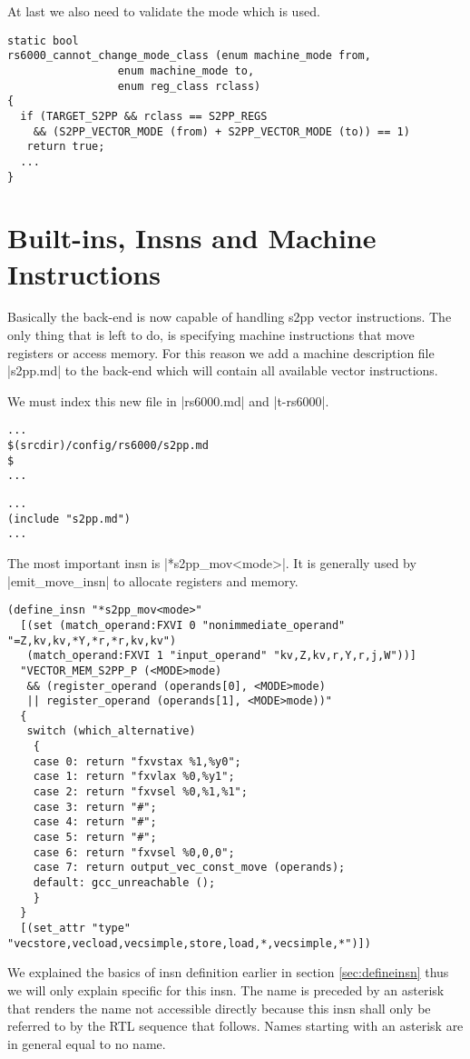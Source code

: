 At last we also need to validate the mode which is used.
\begin{lstlisting}
static bool
rs6000_cannot_change_mode_class (enum machine_mode from,
                 enum machine_mode to,
                 enum reg_class rclass)
{
  if (TARGET_S2PP && rclass == S2PP_REGS
    && (S2PP_VECTOR_MODE (from) + S2PP_VECTOR_MODE (to)) == 1)
   return true;
  ...
}
\end{lstlisting}

\section{Built-ins, Insns and Machine Instructions}
\label{sec:builtins}
Basically the back-end is now capable of handling s2pp vector instructions.
The only thing that is left to do, is specifying machine instructions that move registers or access memory.
For this reason we add a machine description file |s2pp.md| to the back-end which will contain all available vector instructions.

We must index this new file in |rs6000.md| and |t-rs6000|.
\begin{lstlisting}
...
$(srcdir)/config/rs6000/s2pp.md
$
...
\end{lstlisting}
\begin{lstlisting}
...
(include "s2pp.md")
...
\end{lstlisting}

The most important insn is |*s2pp_mov<mode>|.
It is generally used by |emit_move_insn| to allocate registers and memory.
\begin{lstlisting}
(define_insn "*s2pp_mov<mode>"
  [(set (match_operand:FXVI 0 "nonimmediate_operand" "=Z,kv,kv,*Y,*r,*r,kv,kv")
   (match_operand:FXVI 1 "input_operand" "kv,Z,kv,r,Y,r,j,W"))]
  "VECTOR_MEM_S2PP_P (<MODE>mode)
   && (register_operand (operands[0], <MODE>mode) 
   || register_operand (operands[1], <MODE>mode))"
  { 
   switch (which_alternative)
    {
    case 0: return "fxvstax %1,%y0";
    case 1: return "fxvlax %0,%y1";
    case 2: return "fxvsel %0,%1,%1";
    case 3: return "#";
    case 4: return "#";
    case 5: return "#";
    case 6: return "fxvsel %0,0,0";
    case 7: return output_vec_const_move (operands);
    default: gcc_unreachable ();
    }
  } 
  [(set_attr "type" "vecstore,vecload,vecsimple,store,load,*,vecsimple,*")])
\end{lstlisting}

We explained the basics of insn definition earlier in section \ref{sec:defineinsn} thus we will only explain specific for this insn.
The name is preceded by an asterisk that renders the name not accessible directly because this insn shall only be referred to by the \ac{RTL} sequence that follows.
Names starting with an asterisk are in general equal to no name.


